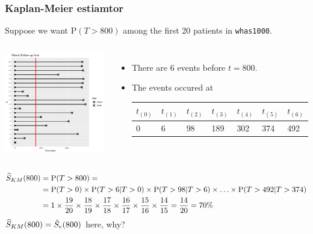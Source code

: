 \documentclass[10pt]{beamer}\usepackage[]{graphicx}\usepackage[]{color}
\newcommand{\p}{\mathrm{P}}
\newcommand{\Skm}{\widehat{S}_{\scriptsize{KM}}}
\begin{document}
\begin{frame}
  \frametitle{Kaplan-Meier estiamtor}
  Suppose we want $\p(T > 800)$ among the first 20 patients in \texttt{whas1000}.
  \begin{columns}
    \includegraphics[scale = .3]{tab1-1-4}
    \begin{itemize}
    \item There are 6 events before $t = 800$.
    \item The events occured at 
      {\scriptsize
      \begin{tabular}{lllllll}
        $t_{(0)}$ & $t_{(1)}$ & $t_{(2)}$ & $t_{(3)}$ & $t_{(4)}$ & $t_{(5)}$ & $t_{(6)}$ \\
        \midrule
        0 & 6 & 98 & 189 & 302 & 374 & 492 \\
      \end{tabular}}
    \end{itemize}
  \end{columns}
  \vspace{-.3cm}
  {\scriptsize
  \begin{align*}
    \Skm(800) &= \p(T > 800) =\\
    &= \p(T > 0) \times \p(T > 6|T > 0) \times \p(T > 98|T > 6) \times
    \ldots\times \p(T > 492|T > 374) \\
    &=1 \times \frac{19}{20} \times \frac{18}{19} \times \frac{17}{18} \times \frac{16}{17} \times \frac{15}{16} \times 
    \frac{14}{15} = \frac{14}{20} = 70\%
  \end{align*}
  }
  $\Skm(800) = \hat S_e(800)$ here, why?
\end{frame}
\end{document}
